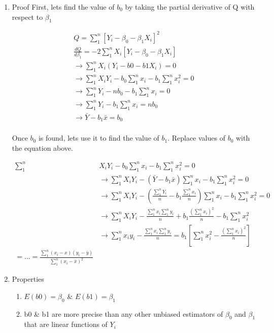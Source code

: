 \documentclass[11pt]{article}
\begin{document}
\begin{enumerate}
\item Proof
\label{sec:org9c5f417}
First, lets find the value of \(b_0\) by taking the partial derivative of Q with
respect to \(\beta_1\)

\begin{equation}
\begin{split}
Q = \sum_{1}^{n} [Y_i - \beta_{0} - \beta_{1}X_i ]^2\\
\frac{dQ}{d \beta_{1}} = -2 \sum_{1}^{n} X_i [Y_i - \beta_{0} - \beta_{1} X_i]\\
\to \sum_{1}^{n} X_i (Y_i - b0 -b1 X_i) = 0\\
\to \sum_{1}^{n} X_i Y_i - b_0 \sum_{1}^{n} x_i - b_1 \sum_{1}^{n} x_i^2 = 0\\
\to \sum_{1}^{n} Y_i - n b_0 - b_1 \sum_{1}^{n} x_i = 0\\
\to \sum_{1}^{n} Y_i - b_1 \sum_{1}^{n} x_i = nb_0\\
\to \bar{Y} - b_1 \bar{x} = b_0\\
\end{split}
\end{equation}

Once \(b_0\) is found, lets use it to find the value of \(b_1\). Replace
values of \(b_0\) with the equation above.

\begin{equation}
\begin{split}
\sum_{1}^{n} & X_i Y_i - b_0 \sum_{1}^{n} x_i - b_1 \sum_{1}^{n} x_i^2 = 0\\
& \to \sum_{1}^{n} X_i Y_i - (\bar{Y} - b_1 \bar{x}) \sum_{1}^{n} x_i - b_1 \sum_{1}^{n} x_i^2 = 0\\
& \to \sum_{1}^{n} X_i Y_i - (\frac{\sum_{1}^{n} Y_i}{n} - b_1 \frac{\sum_{1}^{n} x_i}{n}) \sum_{1}^{n} x_i - b_1 \sum_{1}^{n} x_i^2 = 0\\
& \to \sum_{1}^{n} X_i Y_i - \frac{\sum_{1}^{n} x_i \sum_{1}^{n} y_i}{n} + b_1 \frac{(\sum_{1}^{n} x_i)^2}{n} - b_1 \sum_{1}^{n} x_i^2\\
& \to \sum_{1}^{n} x_i y_i - \frac{\sum_{1}^{n} x_i \sum_{1}^{n} y_i}{n} = b_1 [ \sum_{1}^{n} x_i^2 - \frac{(\sum_{1}^{n} x_i)^2}{n} ]\\
= ... = \frac{\sum_{1}^{n} (x_i - x)(y_i - \bar{y})}{\sum_{1}^{n} (x_i - \bar{x})^2}
\end{split}
\end{equation}

\item Properties
\label{sec:orga0b8d88}
\begin{enumerate}
\item \(E(b0) = \beta_0\) \& \(E(b1) = \beta_1\)
\item b0 \& b1 are more precise than any other unbiased estimators of \(\beta_0\) and
\(\beta_1\) that are linear functions of \(Y_i\)
\end{enumerate}
\end{enumerate}
\end{document}
